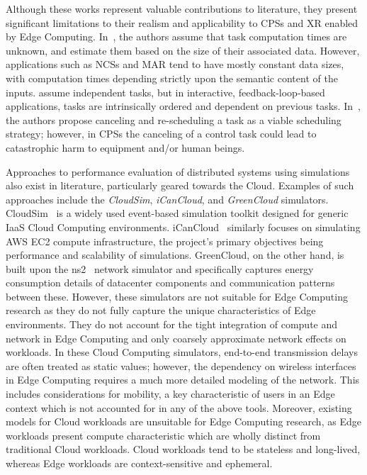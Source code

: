 Although these works represent valuable contributions to literature, they present significant limitations to their realism and applicability to \glspl{CPS} and \gls{XR} enabled by Edge Computing.
In~\cite{chen2015efficient,champati2016semi}, the authors assume that task computation times are unknown, and estimate them based on the size of their associated data.
However, applications such as \glspl{NCS} and \gls{MAR} tend to have mostly constant data sizes, with computation times depending strictly upon the semantic content of the inputs.\@
\cite{champati2016semi,al2017reliable} assume independent tasks, but in interactive, feedback-loop-based applications, tasks are intrinsically ordered and dependent on previous tasks.
In~\cite{champati2015one}, the authors propose canceling and re-scheduling a task as a viable scheduling strategy; however, in \glspl{CPS} the canceling of a control task could lead to catastrophic harm to equipment and/or human beings.

Approaches to performance evaluation of distributed systems using simulations also exist in literature, particularly geared towards the Cloud.
Examples of such approaches include the \emph{CloudSim}, \emph{iCanCloud}, and \emph{GreenCloud} simulators.
CloudSim~\cite{calheiros2011cloudsim} is a widely used event-based simulation toolkit designed for generic \gls{IaaS} Cloud Computing environments.
iCanCloud~\cite{nunez2012icancloud} similarly focuses on simulating \gls{AWS} \gls{EC2} compute infrastructure, the project's primary objectives being performance and scalability of simulations.
GreenCloud, on the other hand, is built upon the \acs{ns2}~\cite{nsnam} network simulator and specifically captures energy consumption details of datacenter components and communication patterns between these.
However, these simulators are not suitable for Edge Computing research as they do not fully capture the unique characteristics of Edge environments.
They do not account for the tight integration of compute and network in Edge Computing and only coarsely approximate network effects on workloads.
In these Cloud Computing simulators, end-to-end transmission delays are often treated as static values;
however, the dependency on wireless interfaces in Edge Computing requires a much more detailed modeling of the network.
This includes considerations for mobility, a key characteristic of users in an Edge context which is not accounted for in any of the above tools.
Moreover, existing models for Cloud workloads are unsuitable for Edge Computing research, as Edge workloads present compute characteristic which are wholly distinct from traditional Cloud workloads.
Cloud workloads tend to be stateless and long-lived, whereas Edge workloads are context-sensitive and ephemeral.


